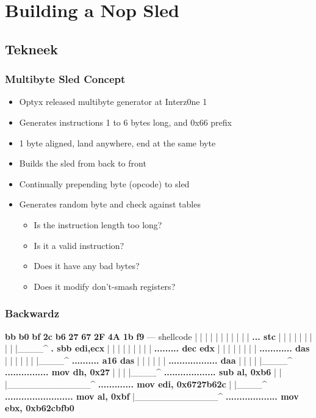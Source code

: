 \documentclass{beamer}
\newenvironment{sitemize}{\vspace{1mm}\begin{itemize}\itemsep 4pt}{\end{itemize}}
\begin{document}
\section{Building a Nop Sled}

\subsection{Tekneek}

\begin{frame}
  \frametitle{Multibyte Sled Concept}
  \begin{sitemize}
    \item Optyx released multibyte generator at Interz0ne 1
    \item Generates instructions 1 to 6 bytes long, and 0x66 prefix
    \item 1 byte aligned, land anywhere, end at the same byte
  \end{sitemize}
  \begin{sitemize}
    \pause
    \item Builds the sled from back to front
    \item Continually prepending byte (opcode) to sled
    \item Generates random byte and check against tables
    \pause
    \begin{sitemize}
      \item Is the instruction length too long?
      \item Is it a valid instruction?
      \item Does it have any bad bytes?
      \item Does it modify don't-smash registers?
    \end{sitemize}
  \end{sitemize}
\end{frame}

\begin{frame}[fragile]
  \frametitle{Backwardz}
  {\footnotesize
  \begin{semiverbatim}
  \textbf<11>{bb} \textbf<10,11>{b0} \textbf<9,10,11>{bf} \textbf<8,9,11>{2c} \textbf<7,8,9,11>{b6} \textbf<6,7,9>{27} \textbf<5,9>{67} \textbf<4,5>{2F} \textbf<3>{4A} \textbf<2>{1b} \textbf<1,2>{f9} --- shellcode
  |  |  |  |  |  |  |  |  |  |  | \textbf<1>{... stc}
  |  |  |  |  |  |  |  |  |  |____^ \textbf<2>{. sbb edi,ecx}
  |  |  |  |  |  |  |  |  | \textbf<3>{......... dec edx}
  |  |  |  |  |  |  |  | \textbf<4>{............ das}
  |  |  |  |  |  |  |____^ \textbf<5>{.......... a16 das}
  |  |  |  |  |  | \textbf<6>{.................. daa}
  |  |  |  |  |____^ \textbf<7>{................ mov dh, 0x27}
  |  |  |  |____^ \textbf<8>{................... sub al, 0xb6}
  |  |  |_____________^ \textbf<9>{............. mov edi, 0x6727b62c}
  |  |____^ \textbf<10>{......................... mov al, 0xbf}
  |_____________^ \textbf<11>{................... mov ebx, 0xb62cbfb0}
\end{semiverbatim}
}
\end{frame}
\end{document}
